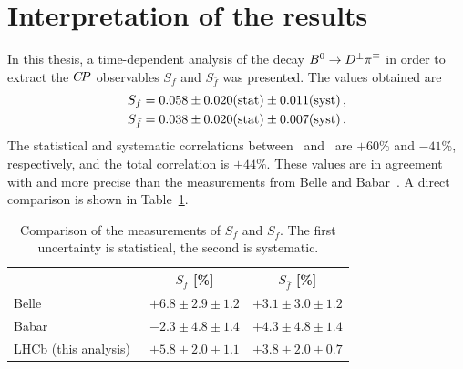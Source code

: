 \section{Interpretation of the results}
\label{sec:results}

In this thesis, a time-dependent analysis of the decay $B^0\rightarrow D^\pm\pi^\mp$ in order to extract the $C\!P$ observables $S_{f}$ and $S_{\bar f}$ was presented. The values obtained are
\begin{align}
 \mbox{\ensuremath{S_f}} = \mbox{\ensuremath{0.058}} \pm \mbox{\ensuremath{0.020}}\mathrm{(stat)} \pm \mbox{\ensuremath{0.011}} \mathrm{(syst)}\,, \label{eq:result_Sf}\\
\mbox{\ensuremath{S_{\bar{f}}}} = \mbox{\ensuremath{0.038}} \pm \mbox{\ensuremath{0.020}}\mathrm{(stat)} \pm \mbox{\ensuremath{0.007}} \mathrm{(syst)}\,. \label{eq:result_Sfbar}
\end{align}
The statistical and systematic correlations between \Sf~and \Sfb~are $+60\%$ and $-41\%$, respectively,
and the total correlation is $+44\%$.
These values are in agreement with and more precise than the measurements
from Belle and Babar~\cite{PhysRevD.73.092003,Aubert:2006tw}. A direct comparison is shown in Table~\ref{tab:results_comparison}.
\begin{table}[btp]
	\centering
	\caption{Comparison of the measurements of $S_{f}$ and
	$S_{\bar f}$. The first uncertainty is statistical, the second is systematic.}
	\begin{tabular}{lcc}
		\toprule
		 & $S_{f}$ [\%] & $S_{\bar f}$ [\%] \\
		\midrule
		Belle~\cite{PhysRevD.73.092003} & $+6.8 \pm 2.9 \pm 1.2 $ & $+3.1 \pm 3.0 \pm 1.2 $ \\
                Babar~\cite{Aubert:2006tw} & $-2.3 \pm 4.8 \pm 1.4 $ & $+4.3 \pm 4.8 \pm 1.4 $\\
                LHCb (this analysis)~\cite{Aaij:2018kpq} & $+5.8 \pm 2.0 \pm 1.1 $ & $+3.8 \pm 2.0 \pm 0.7$ \\
		\bottomrule
	\end{tabular}
	\label{tab:results_comparison}
\end{table}

